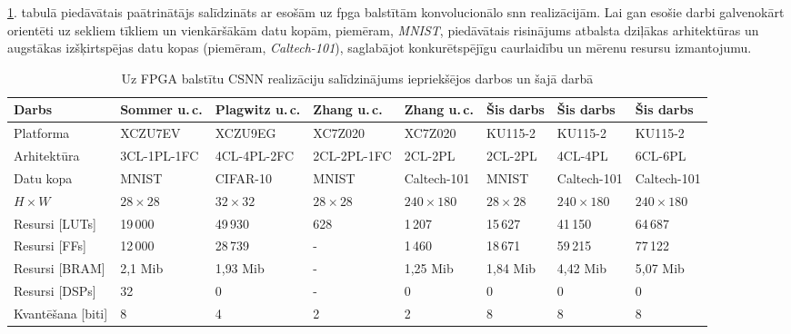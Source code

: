 \ref{tab:sparsity}. tabulā piedāvātais paātrinātājs salīdzināts ar esošām uz \Gls{fpga} balstītām konvolucionālo \Gls{snn} realizācijām. Lai gan esošie darbi galvenokārt orientēti uz sekliem tīkliem un vienkāršākām datu kopām, piemēram, \textit{MNIST}, piedāvātais risinājums atbalsta dziļākas arhitektūras un augstākas izšķirtspējas datu kopas (piemēram, \textit{Caltech-101}), saglabājot konkurētspējīgu caurlaidību un mērenu resursu izmantojumu.

\begin{table}[t]
\centering
\footnotesize
\vspace{0.05in}
\caption{Uz FPGA balstītu CSNN realizāciju salīdzinājums iepriekšējos darbos un šajā darbā}
\label{tab:sparsity}
\begin{adjustbox}{max width=\textwidth}
  \begin{tabular}{@{}lp{1.7cm}p{1.7cm}p{1.7cm}p{1.7cm}p{1.6cm}p{1.6cm}p{1.6cm}@{}}
\toprule
\textbf{Darbs}       & \textbf{Sommer u.\,c.} \cite{sommer2022} & \textbf{Plagwitz u.\,c.} \cite{plagwitz2025} & \textbf{Zhang
    u.\,c. \cite{zhang2024b}} & \textbf{Zhang u.\,c. \cite{zhang2024b}} & \textbf{Šis darbs} & \textbf{Šis darbs} & \textbf{Šis darbs} \\ \midrule
Platforma            & XCZU7EV & XCZU9EG     & XC7Z020     & XC7Z020     & KU115-2 & KU115-2 & KU115-2 \\
Arhitektūra        & 3CL-1PL-1FC & 4CL-4PL-2FC & 2CL-2PL-1FC & 2CL-2PL & 2CL-2PL & 4CL-4PL & 6CL-6PL \\
Datu kopa             & MNIST & CIFAR-10    & MNIST       & Caltech-101 & MNIST   & Caltech-101 & Caltech-101 \\
\textbf{\(H \times W\)} & \(28 \times 28\) & \(32 \times 32\) & \(28 \times 28\) & \(240 \times 180\) & \(28 \times 28\) & \(240 \times 180\) & \(240 \times 180\) \\
\midrule
Resursi [LUTs]    & 19\,000 & 49\,930 & 628 & 1\,207 & 15\,627 & 41\,150 & 64\,687 \\
Resursi [FFs]     & 12\,000 & 28\,739 & -   & 1\,460 & 18\,671 & 59\,215 & 77\,122 \\
Resursi [BRAM]    & 2{,}1 Mib & 1{,}93 Mib & - & 1{,}25 Mib & 1{,}84 Mib  & 4{,}42 Mib & 5{,}07 Mib \\
Resursi [DSPs]    & 32     & 0      & -   & 0      & 0    & 0       & 0       \\
Kvantēšana [biti] & 8     & 4      & 2   & 2     & 8      & 8      & 8      \\
\bottomrule
\end{tabular}
\end{adjustbox}
\end{table}

